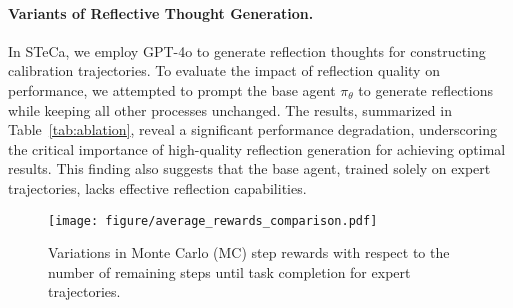 \paragraph{Variants of Reflective Thought Generation.}

In STeCa, we employ GPT-4o to generate reflection thoughts for constructing calibration trajectories.
To evaluate the impact of reflection quality on performance, we attempted to prompt the base agent $\pi_{\theta}$ to generate reflections while keeping all other processes unchanged. The results, summarized in Table~\ref{tab:ablation}, reveal a significant performance degradation, underscoring the critical importance of high-quality reflection generation for achieving optimal results. This finding also suggests that the base agent, trained solely on expert trajectories, lacks effective reflection capabilities. 


\begin{table}[t!]
\centering
{}
\caption{Comparisons between variants of \model.}
\label{tab:ablation}
\end{table}


\begin{figure}[t!]
  \texttt{[image: figure/average\_rewards\_comparison.pdf]}
  \caption{Variations in Monte Carlo (MC) step rewards with respect to the number of remaining steps until task completion for expert trajectories.}
  \label{fig:average_rewards_comparison}
\end{figure}


